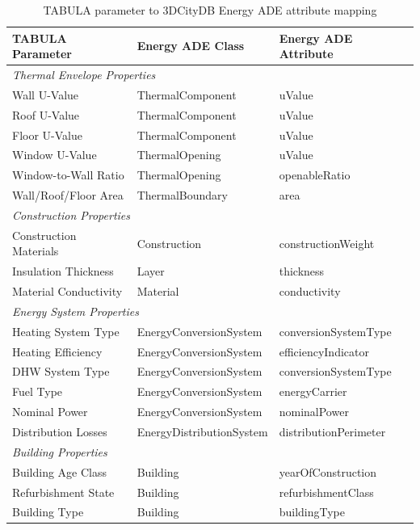 \begin{table}[htbp]
\centering
\caption{TABULA parameter to 3DCityDB Energy ADE attribute mapping}
\label{tab:tabula_energy_ade_mapping}
\small
\begin{tabular}{lll}
\toprule
\textbf{TABULA Parameter} & \textbf{Energy ADE Class} & \textbf{Energy ADE Attribute} \\
\midrule
\multicolumn{3}{l}{\textit{Thermal Envelope Properties}} \\
Wall U-Value & ThermalComponent & uValue \\
Roof U-Value & ThermalComponent & uValue \\
Floor U-Value & ThermalComponent & uValue \\
Window U-Value & ThermalOpening & uValue \\
Window-to-Wall Ratio & ThermalOpening & openableRatio \\
Wall/Roof/Floor Area & ThermalBoundary & area \\
\midrule
\multicolumn{3}{l}{\textit{Construction Properties}} \\
Construction Materials & Construction & constructionWeight \\
Insulation Thickness & Layer & thickness \\
Material Conductivity & Material & conductivity \\
\midrule
\multicolumn{3}{l}{\textit{Energy System Properties}} \\
Heating System Type & EnergyConversionSystem & conversionSystemType \\
Heating Efficiency & EnergyConversionSystem & efficiencyIndicator \\
DHW System Type & EnergyConversionSystem & conversionSystemType \\
Fuel Type & EnergyConversionSystem & energyCarrier \\
Nominal Power & EnergyConversionSystem & nominalPower \\
Distribution Losses & EnergyDistributionSystem & distributionPerimeter \\
\midrule
\multicolumn{3}{l}{\textit{Building Properties}} \\
Building Age Class & Building & yearOfConstruction \\
Refurbishment State & Building & refurbishmentClass \\
Building Type & Building & buildingType \\
\bottomrule
\end{tabular}
\end{table}


